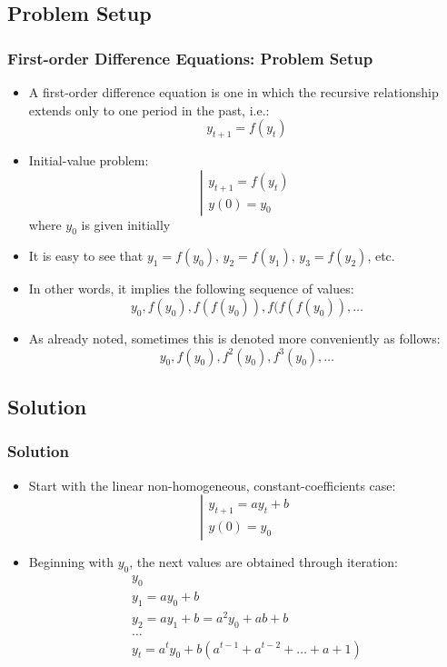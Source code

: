 \documentclass[10pt,usenames,dvipsnames]{beamer}
\theoremstyle{definition}
\begin{document}
\subsection{Problem Setup}
\begin{frame}[fragile]
\frametitle{First-order Difference Equations: Problem Setup}
\begin{itemize}
	\item A first-order difference equation is one in which the recursive relationship extends only to one period in the past, i.e.:
	\[
		y_{t+1} = f(y_{t})
	\]
	\item Initial-value problem:
	\[
		\left|
		\begin{array}{lcl}
			y_{t+1} = f(y_{t})\\
			y(0) = y_{0}
		\end{array}
		\right.
	\]
	where $y_{0}$ is given initially
	\item It is easy to see that $y_{1} = f(y_{0}),\, y_{2} = f(y_{1}),\, y_{3} = f(y_{2})$, etc.
	\item In other words, it implies the following sequence of values:
	\[
		y_{0}, f(y_{0}), f(f(y_{0})), f(f(f(y_{0})),\ldots
	\]
	\item As already noted, sometimes this is denoted more conveniently as follows:
	\[
		y_{0}, f(y_{0}), f^{2}(y_{0}), f^{3}(y_{0}),\ldots
	\]
\end{itemize}
\end{frame}

\subsection{Solution}
\begin{frame}[fragile]
\frametitle{Solution}
\begin{itemize}
	\item Start with the linear non-homogeneous, constant-coefficients case:
	\[
		\left|
		\begin{array}{lcl}
			y_{t+1} = ay_{t} + b\\
			y(0) = y_{0}
		\end{array}
		\right.
	\]
	\item Beginning with $y_{0}$, the next values are obtained through iteration:
	\[
		\begin{array}{lcl}
			y_{0}\\
			y_{1} = ay_{0} + b\\
			y_{2} = ay_{1} + b = a^{2}y_{0} + ab + b\\
			\ldots\\
			y_{t} = a^{t}y_{0} + b(a^{t-1} + a^{t-2} + \ldots + a + 1)
		\end{array}
	\]
\end{itemize}
\end{frame}
\end{document}
